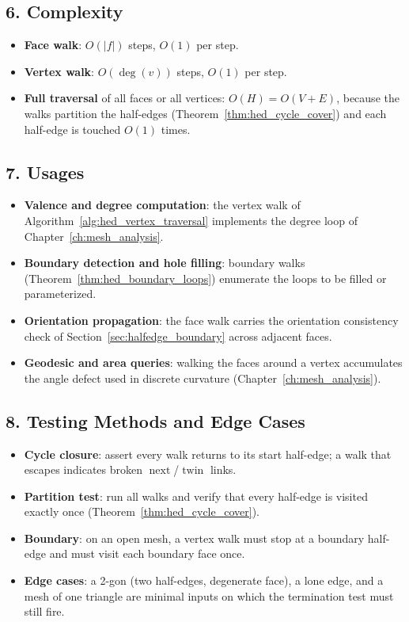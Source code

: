 \subsection{6. Complexity}

\begin{itemize}
  \item \textbf{Face walk}: $O(|f|)$ steps, $O(1)$ per step.
  \item \textbf{Vertex walk}: $O(\deg(v))$ steps, $O(1)$ per step.
  \item \textbf{Full traversal} of all faces or all vertices: $O(H) =
    O(V + E)$, because the walks partition the half-edges
    (Theorem~\ref{thm:hed_cycle_cover}) and each half-edge is touched $O(1)$
    times.
\end{itemize}

\subsection{7. Usages}

\begin{itemize}
  \item \textbf{Valence and degree computation}: the vertex walk of
    Algorithm~\ref{alg:hed_vertex_traversal} implements the degree loop of
    Chapter~\ref{ch:mesh_analysis}.
  \item \textbf{Boundary detection and hole filling}: boundary walks
    (Theorem~\ref{thm:hed_boundary_loops}) enumerate the loops to be filled
    or parameterized.
  \item \textbf{Orientation propagation}: the face walk carries the
    orientation consistency check of Section~\ref{sec:halfedge_boundary}
    across adjacent faces.
  \item \textbf{Geodesic and area queries}: walking the faces around a
    vertex accumulates the angle defect used in discrete curvature
    (Chapter~\ref{ch:mesh_analysis}).
\end{itemize}

\subsection{8. Testing Methods and Edge Cases}

\begin{itemize}
  \item \textbf{Cycle closure}: assert every walk returns to its start
    half-edge; a walk that escapes indicates broken
    $\operatorname{next}$/$\operatorname{twin}$ links.
  \item \textbf{Partition test}: run all walks and verify that every
    half-edge is visited exactly once (Theorem~\ref{thm:hed_cycle_cover}).
  \item \textbf{Boundary}: on an open mesh, a vertex walk must stop at a
    boundary half-edge and must visit each boundary face once.
  \item \textbf{Edge cases}: a 2-gon (two half-edges, degenerate face), a
    lone edge, and a mesh of one triangle are minimal inputs on which the
    termination test must still fire.
\end{itemize}

